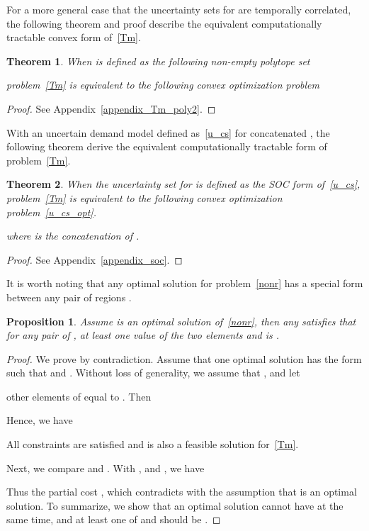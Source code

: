 \documentclass[10pt,twocolumn,twoside,english]{IEEEtran}
\newtheorem{theorem}{Theorem}
\newtheorem{proposition}{Proposition}
\begin{document}
For a more general case that the uncertainty sets for  are temporally correlated, the following theorem and proof describe the equivalent computationally tractable convex form of~\eqref{Tm}. 
\begin{theorem}
When  is defined as the following non-empty polytope set

problem~\eqref{Tm} is equivalent to the following convex optimization problem 

\label{Tm_poly}
\end{theorem}
\begin{proof}
See Appendix~\ref{appendix_Tm_poly2}.
\end{proof}

With an uncertain demand model defined as~\eqref{u_cs} for concatenated , the following theorem derive the equivalent computationally tractable form of problem~\eqref{Tm}.
\begin{theorem}
When the uncertainty set for  is defined as the SOC form of~\eqref{u_cs}, problem~\eqref{Tm} is equivalent to the following convex optimization problem~\eqref{u_cs_opt}.

where  is the concatenation of .
\label{theorem_soc}
\end{theorem}
\begin{proof}
See Appendix~\ref{appendix_soc}.
\end{proof}


It is worth noting that any optimal solution for problem~\eqref{nonr} has a special form between any pair of regions .  
\begin{proposition}
Assume  is an optimal solution of~\eqref{nonr}, then any  satisfies that for any pair of , at least one value of the two elements  and  is .
\end{proposition}
\begin{proof}
We prove by contradiction. Assume that one optimal solution has the form  such that  and . Without loss of generality, we assume that , and let 
 
other elements of   equal to . Then
                                                                                 
Hence, we have

All constraints are satisfied and  is also a feasible solution for~\eqref{Tm}.

Next, we compare  and . With , and
, we have

Thus the partial cost 
,
which contradicts with the assumption that  is an optimal solution. To summarize, we show that an optimal solution cannot have  at the same time, and at least one of   and  should be .
\end{proof}
\end{document}

